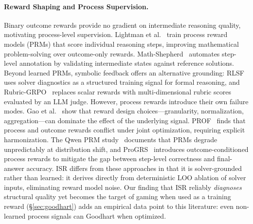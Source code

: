 \paragraph{Reward Shaping and Process Supervision.}
Binary outcome rewards provide no gradient on intermediate reasoning quality, motivating process-level supervision.
Lightman et al.~\cite{lightman-verify-step} train process reward models (PRMs) that score individual reasoning steps, improving mathematical problem-solving over outcome-only rewards.
Math-Shepherd~\cite{math-shepherd} automates step-level annotation by validating intermediate states against reference solutions.
Beyond learned PRMs, symbolic feedback offers an alternative grounding: RLSF~\cite{rlsf} uses solver diagnostics as a structured training signal for formal reasoning, and Rubric-GRPO~\cite{rubric-grpo} replaces scalar rewards with multi-dimensional rubric scores evaluated by an LLM judge.
However, process rewards introduce their own failure modes.
Gao et al.~\cite{gao-effective-rl-reward} show that reward design choices---granularity, normalization, aggregation---can dominate the effect of the underlying signal.
PROF~\cite{prof-process-outcome} finds that process and outcome rewards conflict under joint optimization, requiring explicit harmonization.
The Qwen PRM study~\cite{qwen-prm-lessons} documents that PRMs degrade unpredictably at distribution shift, and ProGRS~\cite{progrs-outcome-conditioned} introduces outcome-conditioned process rewards to mitigate the gap between step-level correctness and final-answer accuracy.
ISR differs from these approaches in that it is solver-grounded rather than learned: it derives directly from deterministic LOO ablation of solver inputs, eliminating reward model noise.
Our finding that ISR reliably \emph{diagnoses} structural quality yet becomes the target of gaming when used as a training reward (\S\ref{sec:goodhart}) adds an empirical data point to this literature: even non-learned process signals can Goodhart when optimized.

